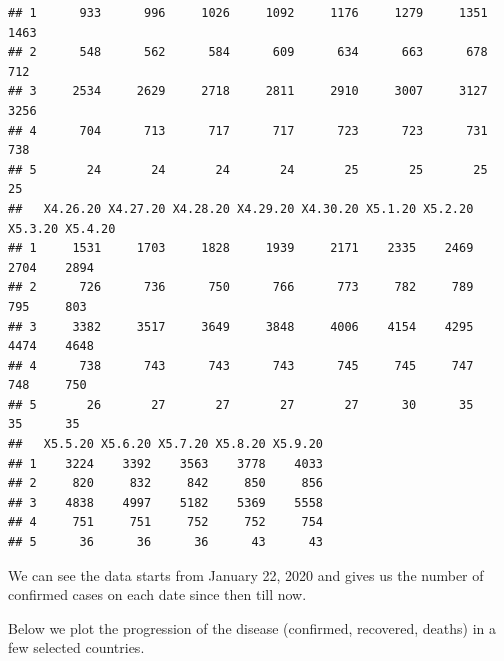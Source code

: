 \documentclass[]{article}
\begin{document}
\begin{verbatim}
## 1      933      996     1026     1092     1176     1279     1351     1463
## 2      548      562      584      609      634      663      678      712
## 3     2534     2629     2718     2811     2910     3007     3127     3256
## 4      704      713      717      717      723      723      731      738
## 5       24       24       24       24       25       25       25       25
##   X4.26.20 X4.27.20 X4.28.20 X4.29.20 X4.30.20 X5.1.20 X5.2.20 X5.3.20 X5.4.20
## 1     1531     1703     1828     1939     2171    2335    2469    2704    2894
## 2      726      736      750      766      773     782     789     795     803
## 3     3382     3517     3649     3848     4006    4154    4295    4474    4648
## 4      738      743      743      743      745     745     747     748     750
## 5       26       27       27       27       27      30      35      35      35
##   X5.5.20 X5.6.20 X5.7.20 X5.8.20 X5.9.20
## 1    3224    3392    3563    3778    4033
## 2     820     832     842     850     856
## 3    4838    4997    5182    5369    5558
## 4     751     751     752     752     754
## 5      36      36      36      43      43
\end{verbatim}

We can see the data starts from January 22, 2020 and gives us the number
of confirmed cases on each date since then till now.

Below we plot the progression of the disease (confirmed, recovered,
deaths) in a few selected countries.
\end{document}
